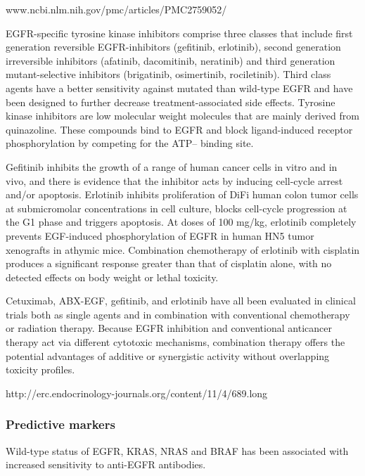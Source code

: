 {{{      www.ncbi.nlm.nih.gov/pmc/articles/PMC2759052/

      EGFR-specific tyrosine kinase inhibitors comprise three classes that
      include first generation reversible  EGFR-inhibitors (gefitinib,
      erlotinib), second generation irreversible inhibitors (afatinib,
      dacomitinib, neratinib) and third generation mutant-selective inhibitors
      (brigatinib, osimertinib, rociletinib). Third class agents have a better
      sensitivity against mutated than wild-type EGFR and have been designed to
      further decrease treatment-associated side effects. Tyrosine
      kinase inhibitors are low molecular weight molecules that are mainly
      derived from quinazoline. These compounds bind to EGFR and block
      ligand-induced receptor phosphorylation by competing for the ATP--
      binding site.

      Gefitinib inhibits the growth of a range of human cancer cells in vitro
      and in vivo, and there is evidence that the inhibitor acts by inducing
      cell-cycle arrest and/or apoptosis. Erlotinib inhibits proliferation of
      DiFi human colon tumor cells at submicromolar concentrations in cell
      culture, blocks cell-cycle progression at the G1 phase and triggers
      apoptosis. At doses of 100 mg/kg, erlotinib completely prevents
      EGF-induced phosphorylation of EGFR in human HN5 tumor xenografts in
      athymic mice. Combination chemotherapy of erlotinib with cisplatin
      produces a significant response greater than that of cisplatin alone, with
      no detected effects on body weight or lethal toxicity.

      Cetuximab, ABX-EGF, gefitinib, and erlotinib have all been evaluated in
      clinical trials both as single agents and in combination with conventional
      chemotherapy or radiation therapy. Because EGFR inhibition and
      conventional anticancer therapy act via different cytotoxic mechanisms,
      combination therapy offers the potential advantages of additive or
      synergistic activity without overlapping toxicity profiles.

      http://erc.endocrinology-journals.org/content/11/4/689.long

    \subsubsection{Predictive markers}

      Wild-type status of EGFR, KRAS, NRAS and BRAF has been associated with
      increased sensitivity to anti-EGFR antibodies.

}}}

